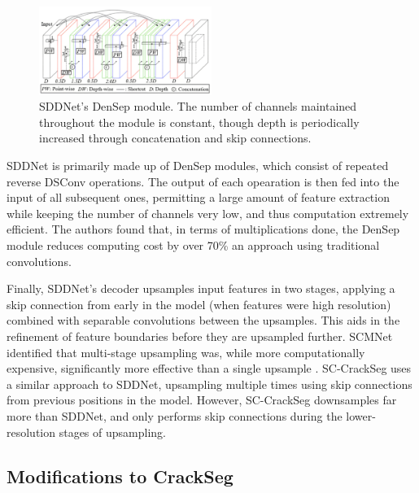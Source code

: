 \documentclass[a4paper,12pt]{report}
\begin{document}
\begin{figure}[ht!]
    \centering
    \includegraphics[width=0.5\textwidth]{res/sddnet-densep-module.png}
    \caption{SDDNet's \cite{choi_sddnet_2019} DenSep module. The number of channels maintained throughout the module is constant, though depth is periodically increased through concatenation and skip connections.}
    \label{fig:densep-module}
\end{figure}

SDDNet is primarily made up of DenSep modules, which consist of repeated reverse DSConv operations. The output of each opearation is then fed into the input of all subsequent ones, permitting a large amount of feature extraction while keeping the number of channels very low, and thus computation extremely efficient. The authors found that, in terms of multiplications done, the DenSep module reduces computing cost by over 70\% an approach using traditional convolutions.

Finally, SDDNet's decoder upsamples input features in two stages, applying a skip connection from early in the model (when features were high resolution) combined with separable convolutions between the upsamples. This aids in the refinement of feature boundaries before they are upsampled further. SCMNet identified that multi-stage upsampling was, while more computationally expensive, significantly more effective than a single upsample \cite{singha_scmnet_2021}. SC-CrackSeg uses a similar approach to SDDNet, upsampling multiple times using skip connections from previous positions in the model. However, SC-CrackSeg downsamples far more than SDDNet, and only performs skip connections during the lower-resolution stages of upsampling.
\subsection{Modifications to CrackSeg}
\end{document}
